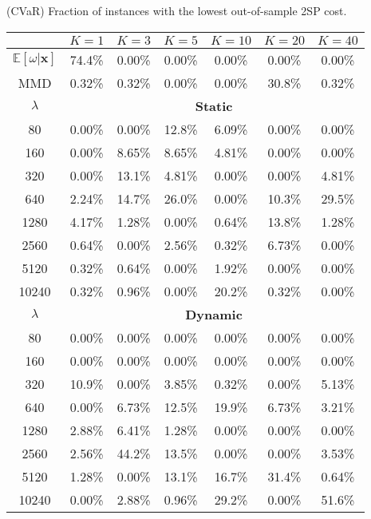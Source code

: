     \begin{table}[h]
         \centering 

        \TABLE
        {(CVaR) Fraction of instances with the lowest out-of-sample 2SP cost. \label{tab:cvar_competition}}
        {
        \begin{tabular}{ccccccc}
        \toprule
         & $K=1$ & $K=3$ & $K=5$ & $K=10$ & $K=20$ & $K=40$ \\
        \midrule
        $\mathbb{E}[\omega | \mathbf{x}]$ & 74.4\%   & 0.00\%    & 0.00\%    & 0.00\%    & 0.00\%    & 0.00\%    \\
        MMD & 0.32\%   & 0.32\%    & 0.00\%    & 0.00\%    & 30.8\%    & 0.32\%    \\
        \midrule
        \multicolumn{1}{c}{$\lambda$} & \multicolumn{6}{c}{\textbf{Static}} \\
        \midrule
        80    & 0.00\%   & 0.00\%    & 12.8\%    & 6.09\%    & 0.00\%    & 0.00\%    \\
        160   & 0.00\%   & 8.65\%    & 8.65\%    & 4.81\%    & 0.00\%    & 0.00\%    \\
        320   & 0.00\%   & 13.1\%    & 4.81\%    & 0.00\%    & 0.00\%    & 4.81\%    \\
        640   & 2.24\%   & 14.7\%    & 26.0\%    & 0.00\%    & 10.3\%    & 29.5\%    \\
        1280  & 4.17\%   & 1.28\%    & 0.00\%    & 0.64\%    & 13.8\%    & 1.28\%    \\
        2560  & 0.64\%   & 0.00\%    & 2.56\%    & 0.32\%    & 6.73\%    & 0.00\%    \\
        5120  & 0.32\%   & 0.64\%    & 0.00\%    & 1.92\%    & 0.00\%    & 0.00\%    \\
        10240 & 0.32\%   & 0.96\%    & 0.00\%    & 20.2\%    & 0.32\%    & 0.00\%    \\
        \midrule
        \multicolumn{1}{c}{$\lambda$} & \multicolumn{6}{c}{\textbf{Dynamic}} \\
        \midrule
        80    & 0.00\%   & 0.00\%    & 0.00\%    & 0.00\%    & 0.00\%    & 0.00\%    \\
        160   & 0.00\%   & 0.00\%    & 0.00\%    & 0.00\%    & 0.00\%    & 0.00\%    \\
        320   & 10.9\%   & 0.00\%    & 3.85\%    & 0.32\%    & 0.00\%    & 5.13\%    \\
        640   & 0.00\%   & 6.73\%    & 12.5\%    & 19.9\%    & 6.73\%    & 3.21\%    \\
        1280  & 2.88\%   & 6.41\%    & 1.28\%    & 0.00\%    & 0.00\%    & 0.00\%    \\
        2560  & 2.56\%   & 44.2\%    & 13.5\%    & 0.00\%    & 0.00\%    & 3.53\%    \\
        5120  & 1.28\%   & 0.00\%    & 13.1\%    & 16.7\%    & 31.4\%    & 0.64\%    \\
        10240 & 0.00\%   & 2.88\%    & 0.96\%    & 29.2\%    & 0.00\%    & 51.6\%    \\
        \bottomrule
        \end{tabular}}{}
\end{table}


